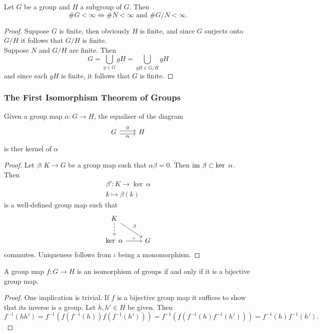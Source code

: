 \begin{lemma}\label{ConditionOnGroupBeingFinite}
    Let $G$ be a group and $H$ a subgroup of $G$. Then 
    $$
        \# G <\infty \iff \#N <\infty \text{ and } \#G/N < \infty.
    $$
\end{lemma}
\begin{proof}
    Suppose $G$ is finite, then obviously $H$ is finite, and since $G$ surjects onto $G/H$ it follows that $G/H$ is finite.\\
    Suppose $N$ and $G/H$ are finite. Then 
    $$
        G = \bigcup_{g\in G} gH = \bigcup_{gH \in G/H} gH
    $$ 
    and since each $gH$ is finite, it follows that $G$ is finite. 
\end{proof}

\subsubsection{The First Isomorphism Theorem of Groups}
\begin{proposition}
    Given a group map $\alpha :  G\rightarrow H$, the equaliser of the diagram
    $$
        \begin{tikzcd}
             G \arrow[r, shift right=0.5ex, "\alpha", swap] \arrow[r, shift left=0.5ex,"0"] & H 
        \end{tikzcd}    
    $$
    is ther kernel of $\alpha$
\end{proposition}
\begin{proof}
    Let $\beta: K \rightarrow G$ be a group map such that $\alpha\beta = 0$. Then $\im \ \beta \subset \ker \ \alpha$. Then 
    \begin{gather*}
        \beta' : K \rightarrow \ker \ \alpha\\
        k \mapsto \beta(k)
    \end{gather*}
    is a well-defined group map such that 
    $$
        \begin{tikzcd}
            K \arrow[rd, "\beta"] \arrow[d,dashrightarrow] \\
            \ker \ \alpha \arrow[r,"\iota"] & G
        \end{tikzcd}
    $$
    commutes. Uniqueness follows from $\iota$ being a monomorphism. 
\end{proof}
\begin{lemma}
    A group map $f : G\rightarrow H$ is an isomorphism of groups if and only if it is a bijective group map. 
\end{lemma}
\begin{proof}
    One implication is trivial. If $f$ is a bijective group map it suffices to show that its inverse is a group. Let $h,h'\in H$ be given. Then 
    $$
      f^{-1}(hh') = f^{-1}(f(f^{-1}(h))f(f^{-1}(h'))) =f^{-1}(f(f^{-1}(h)f^{-1}(h')))= f^{-1}(h)f^{-1}(h').
    $$
\end{proof}
